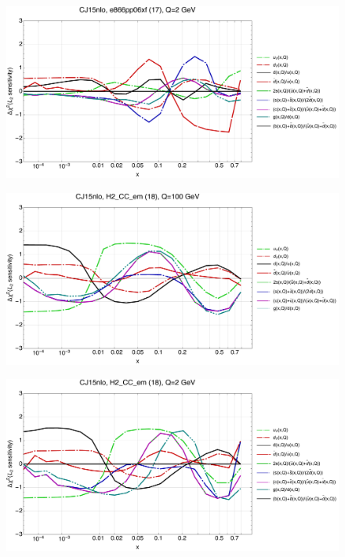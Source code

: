 \documentclass[10pt,aps,prd,floatfix,titlepage]{revtex4}
\begin{document}
\begin{figure}
\includegraphics[width=\textwidth,height=0.44\textheight,keepaspectratio]{2/17_CJ15nlo_q2_Sf_2.pdf}
\caption{}
\end{figure}
\clearpage
\begin{figure}
\includegraphics[width=\textwidth,height=0.44\textheight,keepaspectratio]{2/18_CJ15nlo_q100_Sf_2.pdf}
\caption{}
\end{figure}
\begin{figure}
\includegraphics[width=\textwidth,height=0.44\textheight,keepaspectratio]{2/18_CJ15nlo_q2_Sf_2.pdf}
\caption{}
\end{figure}
\end{document}
